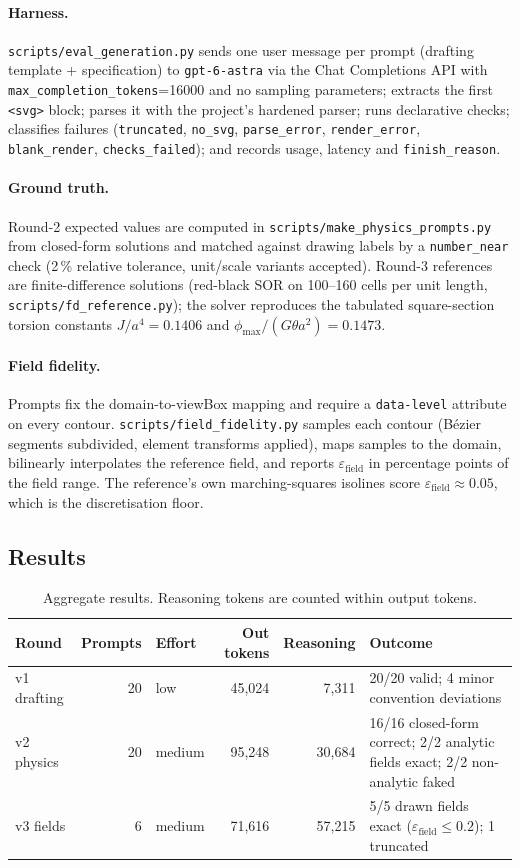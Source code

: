 \documentclass[11pt,a4paper]{article}
\newcommand{\astra}{\texttt{gpt-6-astra}}
\newcommand{\eps}{\varepsilon_{\mathrm{field}}}
\begin{document}
\paragraph{Harness.} \texttt{scripts/eval\_generation.py} sends one user message per prompt (drafting template + specification) to \astra{} via the Chat Completions API with \texttt{max\_completion\_tokens}=16000 and no sampling parameters; extracts the first \texttt{<svg>} block; parses it with the project's hardened parser; runs declarative checks; classifies failures (\texttt{truncated}, \texttt{no\_svg}, \texttt{parse\_error}, \texttt{render\_error}, \texttt{blank\_render}, \texttt{checks\_failed}); and records usage, latency and \texttt{finish\_reason}.
\paragraph{Ground truth.} Round-2 expected values are computed in \texttt{scripts/make\_physics\_prompts.py} from closed-form solutions and matched against drawing labels by a \texttt{number\_near} check (2\,\% relative tolerance, unit/scale variants accepted). Round-3 references are finite-difference solutions (red-black SOR on 100--160 cells per unit length, \texttt{scripts/fd\_reference.py}); the solver reproduces the tabulated square-section torsion constants $J/a^4=0.1406$ and $\phi_{\max}/(G\theta a^2)=0.1473$.
\paragraph{Field fidelity.} Prompts fix the domain-to-viewBox mapping and require a \texttt{data-level} attribute on every contour. \texttt{scripts/field\_fidelity.py} samples each contour (B\'ezier segments subdivided, element transforms applied), maps samples to the domain, bilinearly interpolates the reference field, and reports $\eps$ in percentage points of the field range. The reference's own marching-squares isolines score $\eps\approx0.05$, which is the discretisation floor.\par\endgroup

\subsection{Results}
\begin{table}[h]
\centering\small
\begin{tabular}{lrlrrp{5.6cm}}
\toprule
Round & Prompts & Effort & Out tokens & Reasoning & Outcome \\
\midrule
v1 drafting & 20 & low & 45{,}024 & 7{,}311 & 20/20 valid; 4 minor convention deviations \\
v2 physics & 20 & medium & 95{,}248 & 30{,}684 & 16/16 closed-form correct; 2/2 analytic fields exact; 2/2 non-analytic faked \\
v3 fields & 6 & medium & 71{,}616 & 57{,}215 & 5/5 drawn fields exact ($\eps\le0.2$); 1 truncated \\
\bottomrule
\end{tabular}
\caption{Aggregate results. Reasoning tokens are counted within output tokens.}
\end{table}
\end{document}
